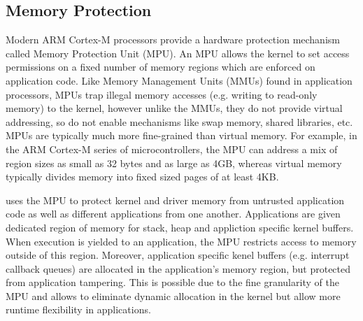 \subsection{Memory Protection}

Modern ARM Cortex-M processors provide a hardware protection mechanism called
Memory Protection Unit (MPU).  An MPU allows the kernel to set access
permissions on a fixed number of memory regions which are enforced on
application code. Like Memory Management Units (MMUs) found in application
processors, MPUs trap illegal memory accesses (e.g. writing to read-only
memory) to the kernel, however unlike the MMUs, they do not provide virtual
addressing, so do not enable mechanisms like swap memory, shared libraries,
etc. MPUs are typically much more fine-grained than virtual memory. For
example, in the ARM Cortex-M series of microcontrollers, the MPU can address a
mix of region sizes as small as 32 bytes and as large as 4GB, whereas virtual
memory typically divides memory into fixed sized pages of at least 4KB.

\name uses the MPU to protect kernel and driver memory from untrusted
application code as well as different applications from one another.
Applications are given dedicated region of memory for stack, heap and appliction
specific kernel buffers. When execution is yielded to an application, the MPU
restricts access to memory outside of this region. Moreover, application
specific kenel buffers (e.g. interrupt callback queues) are allocated in the
application's memory region, but protected from application tampering. This is
possible due to the fine granularity of the MPU and allows \name to eliminate
dynamic allocation in the kernel but allow more runtime flexibility in
applications.
